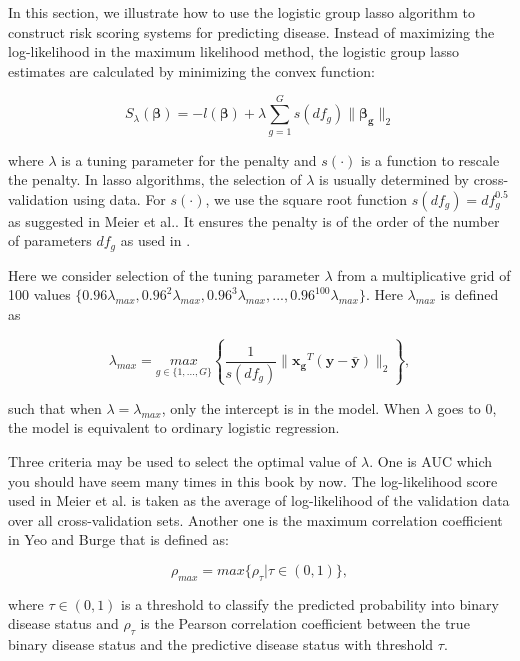 \documentclass[
  12pt,
]{krantz}
\begin{document}
In this section, we illustrate how to use the logistic group lasso algorithm to construct risk scoring systems for predicting disease. Instead of maximizing the log-likelihood in the maximum likelihood method, the logistic group lasso estimates are calculated by minimizing the convex function:

\[
S_{\lambda}(\symbf{\beta})=-l(\symbf{\beta})+\lambda\sum_{g=1}^{G}s(df_{g})\parallel\symbf{\beta_{g}}\parallel_{2}
\]

where \(\lambda\) is a tuning parameter for the penalty and \(s(\cdot)\) is a function to rescale the penalty. In lasso algorithms, the selection of \(\lambda\) is usually determined by cross-validation using data. For \(s(\cdot)\), we use the square root function \(s(df_g)=df_g^{0.5}\) as suggested in Meier et al.\citep{Meier2008}. It ensures the penalty is of the order of the number of parameters \(df_g\) as used in \citep{Yuan2007}.

Here we consider selection of the tuning parameter \(\lambda\) from a multiplicative grid of 100 values \(\{0.96\lambda_{max},0.96^{2}\lambda_{max},0.96^{3}\lambda_{max},...,0.96^{100}\lambda_{max}\}\). Here \(\lambda_{max}\) is defined as

\begin{equation}
\lambda_{max}=\underset{g\in\{1,...,G\}}{max}\left\{\frac{1}{s(df_{g})}\parallel \mathbf{x_{g}}^{T}(\mathbf{y}-\bar{\mathbf{y}} )\parallel_{2}\right\},
\end{equation}

such that when \(\lambda=\lambda_{max}\), only the intercept is
in the model. When \(\lambda\) goes to \(0\), the model is equivalent to ordinary
logistic regression.

Three criteria may be used to select the optimal value of \(\lambda\). One is AUC which you should have seem many times in this book by now. The log-likelihood score used in Meier et al. \citep{Meier2008} is taken as the average of log-likelihood of the validation data over all cross-validation sets. Another one is the maximum correlation coefficient in Yeo and Burge \citep{Yeo2004} that is defined as:

\[
\rho_{max}=max\{\rho_{\tau}|\tau\in(0,1)\},
\]

where \(\tau\in(0,1)\) is a threshold to classify the predicted probability into binary disease status and \(\rho_\tau\) is the Pearson correlation coefficient between the true binary disease status and the predictive disease status with threshold \(\tau\).
\end{document}
